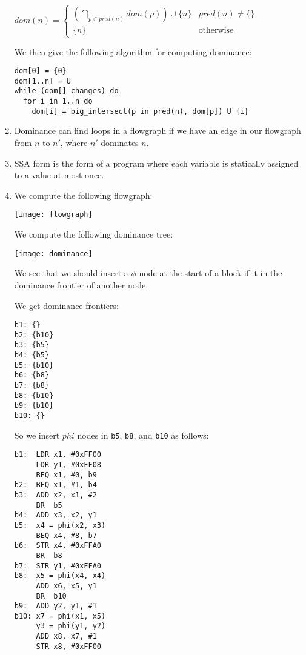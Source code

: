 \begin{enumerate}[label=(\alph*)]
    $dom(n) = \begin{cases}(\bigcap_{p \in pred(n)} dom(p)) \cup \{n\} & pred(n) \neq \{\}\\\{n\} & \text{otherwise}\end{cases}$

    We then give the following algorithm for computing dominance:

\begin{verbatim}
dom[0] = {0}
dom[1..n] = U
while (dom[] changes) do
  for i in 1..n do
    dom[i] = big_intersect(p in pred(n), dom[p]) U {i}
\end{verbatim}

\item
  Dominance can find loops in a flowgraph if we have an edge in our flowgraph from $n$ to $n'$, where $n'$ dominates $n$.

\item
  SSA form is the form of a program where each variable is statically assigned to a value at most once.

\item


  We compute the following flowgraph:

  \texttt{[image: flowgraph]}

  We compute the following dominance tree:

  \texttt{[image: dominance]}

  We see that we should insert a $\phi$ node at the start of a block if it in the dominance frontier of another node.

  We get dominance frontiers:

\begin{verbatim}
b1: {}
b2: {b10}
b3: {b5}
b4: {b5}
b5: {b10}
b6: {b8}
b7: {b8}
b8: {b10}
b9: {b10}
b10: {}
\end{verbatim}

So we insert $phi$ nodes in \texttt{b5}, \texttt{b8}, and \texttt{b10} as follows:

\begin{verbatim}
b1:  LDR x1, #0xFF00
     LDR y1, #0xFF08
     BEQ x1, #0, b9
b2:  BEQ x1, #1, b4
b3:  ADD x2, x1, #2
     BR  b5
b4:  ADD x3, x2, y1
b5:  x4 = phi(x2, x3) 
     BEQ x4, #8, b7
b6:  STR x4, #0xFFA0
     BR  b8
b7:  STR y1, #0xFFA0
b8:  x5 = phi(x4, x4)
     ADD x6, x5, y1
     BR  b10
b9:  ADD y2, y1, #1
b10: x7 = phi(x1, x5)
     y3 = phi(y1, y2)
     ADD x8, x7, #1
     STR x8, #0xFF00
\end{verbatim}





        
    \end{enumerate}

